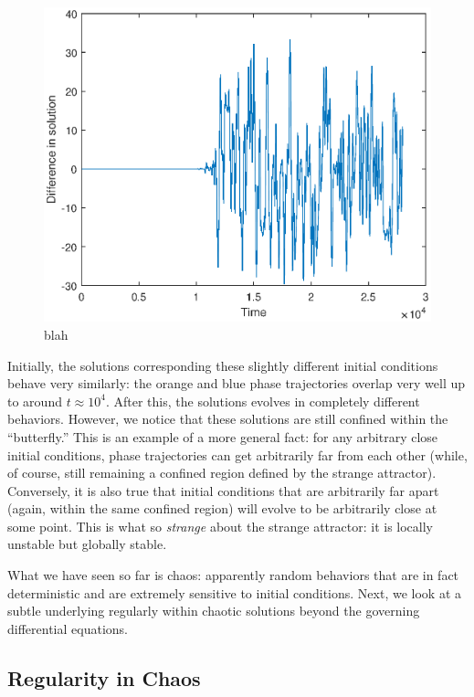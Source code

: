 \documentclass[twocolumn,amsmath,amssymb,aps]{revtex4}
\begin{document}
\begin{figure}[!htb]
	\centering
	\includegraphics[scale=0.5]{difference_init}
	\caption{blah}
	\label{fig:X_sensitive_1}
\end{figure}
Initially, the solutions corresponding these slightly different initial conditions behave very similarly: the orange and blue phase trajectories overlap very well up to around $t\approx 10^{4}$. After this, the solutions evolves in completely different behaviors. However, we notice that these solutions are still confined within the ``butterfly.'' This is an example of a more general fact: for any arbitrary close initial conditions, phase trajectories can get arbitrarily far from each other (while, of course, still remaining a confined region defined by the strange attractor). Conversely, it is also true that initial conditions that are arbitrarily far apart (again, within the same confined region) will evolve to be arbitrarily close at some point. This is what so \textit{strange} about the strange attractor: it is locally unstable but globally stable. 

What we have seen so far is chaos: apparently random behaviors that are in fact deterministic and are extremely sensitive to initial conditions. Next, we look at a subtle underlying regularly within chaotic solutions beyond the governing differential equations.






\subsection{Regularity in Chaos}
\end{document}
